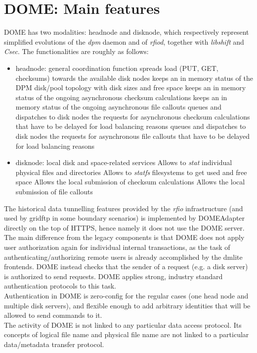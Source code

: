 \documentclass[a4paper]{jpconf}
\begin{document}
\section{DOME: Main features}
DOME has two modalities: headnode and disknode, which respectively represent
simplified evolutions of the \textit{dpm} daemon and of \textit{rfiod}, together with \textit{libshift} and \textit{Csec}.
The functionalities are roughly as follows:
\begin{itemize}
 \item headnode: general coordination function
 \subitem spreads load (PUT, GET, checksums) towards the available disk nodes
 \subitem keeps an in memory status of the DPM disk/pool topology with disk sizes and free space
 \subitem keeps an in memory status of the ongoing asynchronous checksum calculations
 \subitem keeps an in memory status of the ongoing asynchronous file callouts
 \subitem queues and dispatches to disk nodes the requests for asynchronous checksum calculations that have to be delayed for load balancing reasons
 \subitem queues and dispatches to disk nodes the requests for asynchronous file callouts that have to be delayed for load balancing reasons

 \item disknode: local disk and space-related services
 \subitem Allows to \textit{stat} individual physical files and directories
 \subitem Allows to \textit{statfs} filesystems to get used and free space
 \subitem Allows the local submission of checksum calculations
 \subitem Allows the local submission of file callouts
\end{itemize}

The historical data tunnelling features provided by the \textit{rfio} infrastructure (and used by gridftp in some boundary scenarios) \cite{rfiowan}
is implemented by DOMEAdapter directly on the top of HTTPS, hence namely it does not use the DOME server.\\

The main difference from the legacy components is that DOME does not apply user authorization again for individual internal
transactions, as the task of authenticating/authorizing remote users is already accomplished by the dmlite frontends.
DOME instead checks that the sender of a request (e.g. a disk server) is authorized to
send requests. DOME applies strong, industry standard authentication protocols to this task.\\
Authentication in DOME is zero-config for the regular cases (one head node and multiple disk servers), and flexible enough
to add arbitrary identities that will be allowed to send commands to it.\\
The activity of DOME is not linked to any particular data access protocol. Its concepts of logical file name and physical file name are not linked to a particular data/metadata transfer protocol.
\end{document}
